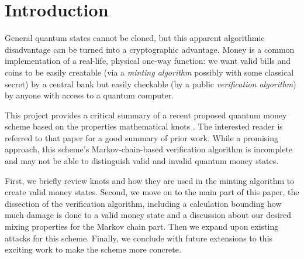 \section{Introduction}

General quantum states cannot be cloned, but this apparent
algorithmic disadvantage can be turned into a cryptographic advantage.
Money is a common implementation of a
real-life, physical one-way function:
we want valid bills and coins to be easily creatable (via a
\emph{minting algorithm} possibly with some classical secret) by a central
bank but easily checkable (by a public \emph{verification algorithm})
by anyone with access to a quantum computer.

This project provides a critical summary of a recent proposed 
 quantum money scheme based on the properties
mathematical knots \cite{Farhi2010}.
The interested reader is referred to that paper for
a good summary of prior work.
While a promising approach, this scheme's Markov-chain-based
verification algorithm is incomplete
and may not be able to distinguish valid and invalid quantum money states.

First, we briefly review knots and how they are used
in the minting algorithm to create valid money states.
Second, we move on to the main part of this paper, the dissection of the
verification algorithm, including a calculation bounding how much
damage is done to a valid money state and a discussion about our
desired mixing properties for the Markov chain part.
Then we expand upon existing attacks for this scheme.
Finally, we conclude with future extensions to this exciting work to
make the scheme more concrete.




